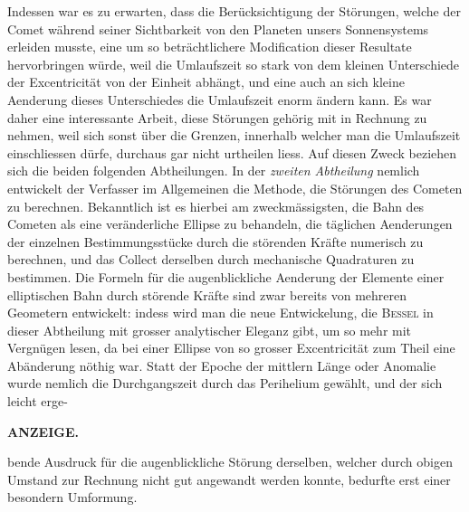 Indessen war es zu erwarten, dass die Berücksichtigung der Störungen, welche der Comet während seiner Sichtbarkeit von den Planeten unsers Sonnensystems erleiden musste, eine um so beträchtlichere Modification dieser Resultate hervorbringen würde, weil die Umlaufszeit so stark von dem kleinen Unterschiede der Excentricität von der Einheit abhängt, und eine auch an sich kleine Aenderung dieses Unterschiedes die Umlaufszeit enorm ändern kann. Es war daher eine interessante Arbeit, diese Störungen gehörig mit in Rechnung zu nehmen, weil sich sonst über die Grenzen, innerhalb welcher man die Umlaufszeit einschliessen dürfe, durchaus gar nicht urtheilen liess. Auf diesen Zweck beziehen sich die beiden folgenden Abtheilungen. In der \emph{zweiten Abtheilung} nemlich entwickelt der Verfasser im Allgemeinen die Methode, die Störungen des Cometen zu berechnen. Bekanntlich ist es hierbei am zweckmässigsten, die Bahn des Cometen als eine veränderliche Ellipse zu behandeln, die täglichen Aenderungen der einzelnen Bestimmungsstücke durch die störenden Kräfte numerisch zu berechnen, und das Collect derselben durch mechanische Quadraturen zu bestimmen. Die Formeln für die augenblickliche Aenderung der Elemente einer elliptischen Bahn durch störende Kräfte sind zwar bereits von mehreren Geometern entwickelt: indess wird man die neue Entwickelung, die \textsc{Bessel} in dieser Abtheilung mit grosser analytischer Eleganz gibt, um so mehr mit Vergnügen lesen, da bei einer Ellipse von so grosser Excentricität zum Theil eine Abänderung nöthig war. Statt der Epoche der mittlern Länge oder Anomalie wurde nemlich die Durchgangszeit durch das Perihelium gewählt, und der sich leicht erge-\par
\clearpage
{}
\noindent{}%
\parbox[b]{\dimexpr\textwidth-20mm\relax}{\centering\small\textbf{ANZEIGE.}}%
\makebox[10mm][r]{}\par\nobreak\medskip
\noindent bende Ausdruck für die augenblickliche Störung derselben, welcher durch obigen Umstand zur Rechnung nicht gut angewandt werden konnte, bedurfte erst einer besondern Umformung.

